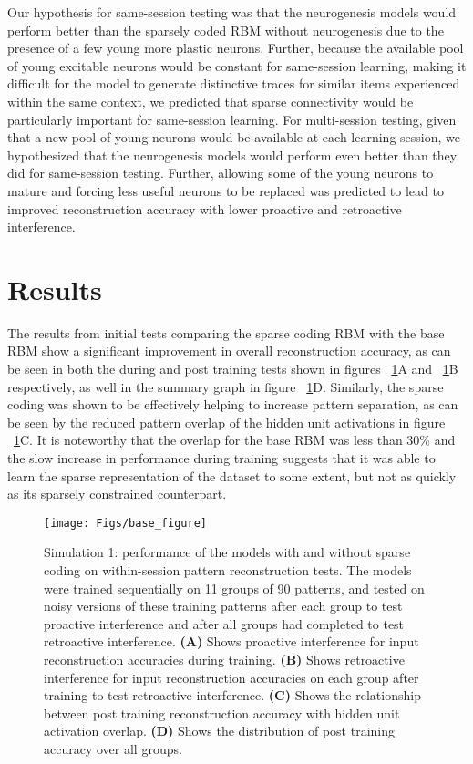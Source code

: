 Our hypothesis for same-session testing was that the neurogenesis models would perform better 
than the sparsely coded \ac{RBM} without neurogenesis due to the presence of a 
few young more plastic neurons. 
Further, because the available pool of young excitable neurons would be
constant for same-session learning, making it difficult for the model to
generate distinctive traces for similar items experienced within the same
context, we predicted that sparse connectivity would be particularly
important for same-session learning.
For multi-session testing, given that a new pool of young neurons would be
available at each learning session, we hypothesized that the neurogenesis models would
perform even better than they did for same-session testing. 
Further, allowing some of the young neurons to mature and forcing less useful neurons
to be replaced was predicted to lead to improved reconstruction
accuracy with lower proactive and retroactive interference. 

\section{Results}

The results from initial tests comparing the sparse coding \ac{RBM} with the base \ac{RBM} 
show a significant improvement in overall reconstruction accuracy, as can be seen in both 
the during and post training tests shown in figures ~\ref{fig:base_figure}A and ~\ref{fig:base_figure}B 
respectively, as well in the summary graph in figure ~\ref{fig:base_figure}D.  
Similarly, the sparse coding was shown to be effectively helping to increase pattern separation, 
as can be seen by the reduced pattern overlap of the hidden unit activations in figure ~\ref{fig:base_figure}C. 
It is noteworthy that the overlap for the base \ac{RBM} was less than 30\% and the slow 
increase in performance during training suggests that it was able to learn the sparse 
representation of the dataset to some extent, but not as quickly as its sparsely constrained counterpart.

\begin{figure}[!h]
\begin{center}
\texttt{[image: Figs/base\_figure]}
\end{center}
\caption{ Simulation 1: performance of the models with and without sparse coding on 
within-session pattern reconstruction tests. 
The models were trained sequentially on 11 groups of 90 patterns, and tested on noisy 
versions of these training patterns after each group to test proactive interference and 
after all groups had completed to test retroactive interference. 
\textbf{(A)} Shows proactive interference for input reconstruction accuracies during training. 
\textbf{(B)} Shows retroactive interference for input reconstruction accuracies on each 
group after training to test retroactive interference. 
\textbf{(C)} Shows the relationship between post training reconstruction accuracy with hidden unit activation overlap. \textbf{(D)} Shows the distribution of post training accuracy over all groups.}
\label{fig:base_figure}
\end{figure}

